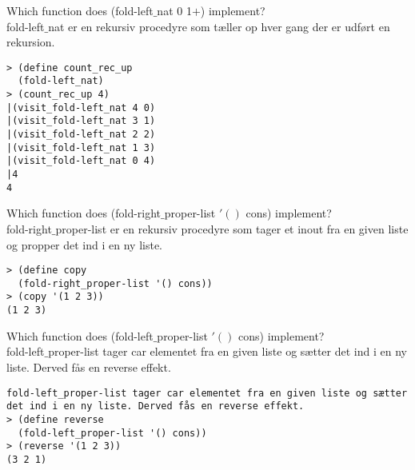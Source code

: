 \documentclass{article}
\begin{document}
Which function does (fold-left$\_$nat 0 1$+$) implement?\\
fold-left$\_$nat er en rekursiv procedyre som tæller op hver gang der er udført en rekursion.
\begin{verbatim}
> (define count_rec_up
  (fold-left_nat)
> (count_rec_up 4)
|(visit_fold-left_nat 4 0)
|(visit_fold-left_nat 3 1)
|(visit_fold-left_nat 2 2)
|(visit_fold-left_nat 1 3)
|(visit_fold-left_nat 0 4)
|4
4
\end{verbatim}
Which function does (fold-right$\_$proper-list $'()$ cons) implement?\\
fold-right$\_$proper-list er en rekursiv procedyre som tager et inout fra en given liste og propper det ind i en ny liste.
\begin{verbatim}
> (define copy
  (fold-right_proper-list '() cons))
> (copy '(1 2 3))
(1 2 3)
\end{verbatim}

Which function does (fold-left$\_$proper-list $'()$ cons) implement?\\
fold-left$\_$proper-list tager car elementet fra en given liste og sætter det ind i en ny liste. Derved fås en reverse effekt.
\begin{verbatim}
fold-left_proper-list tager car elementet fra en given liste og sætter det ind i en ny liste. Derved fås en reverse effekt.
> (define reverse
  (fold-left_proper-list '() cons))
> (reverse '(1 2 3))
(3 2 1)
\end{verbatim}
\end{document}
